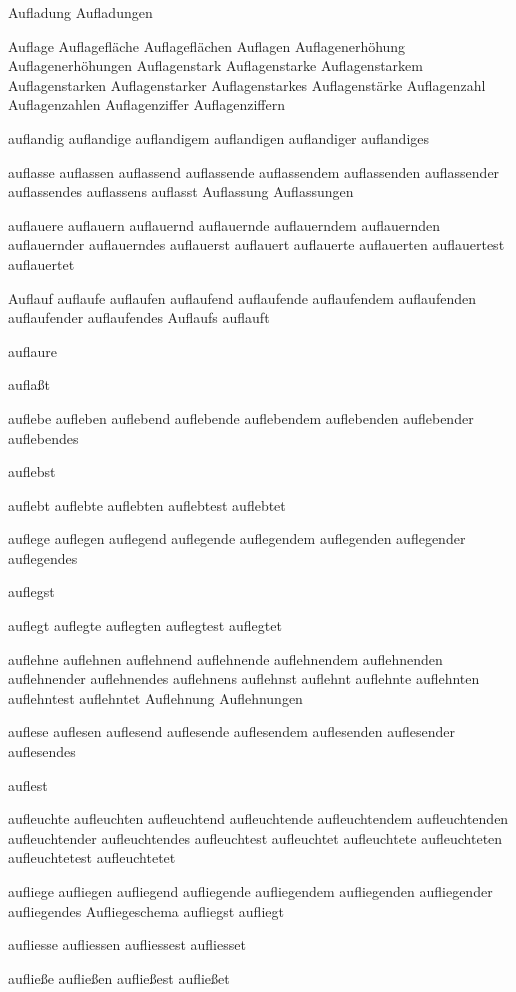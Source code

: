 Aufladung Aufladungen

Auflage Auflagefläche Auflageflächen Auflagen Auflagenerhöhung Auflagenerhöhungen Auflagenstark Auflagenstarke Auflagenstarkem Auflagenstarken Auflagenstarker Auflagenstarkes Auflagenstärke Auflagenzahl Auflagenzahlen Auflagenziffer Auflagenziffern

auflandig auflandige auflandigem auflandigen auflandiger auflandiges

auflasse auflassen auflassend auflassende auflassendem auflassenden auflassender auflassendes auflassens auflasst Auflassung Auflassungen

auflauere auflauern auflauernd auflauernde auflauerndem auflauernden auflauernder auflauerndes auflauerst auflauert auflauerte auflauerten auflauertest auflauertet

Auflauf auflaufe auflaufen auflaufend auflaufende auflaufendem auflaufenden auflaufender auflaufendes Auflaufs auflauft

auflaure

auflaßt

auflebe aufleben auflebend auflebende auflebendem auflebenden auflebender auflebendes

auflebst

auflebt auflebte auflebten auflebtest auflebtet

auflege auflegen auflegend auflegende auflegendem auflegenden auflegender auflegendes

auflegst

auflegt auflegte auflegten auflegtest auflegtet

auflehne auflehnen auflehnend auflehnende auflehnendem auflehnenden auflehnender auflehnendes auflehnens auflehnst auflehnt auflehnte auflehnten auflehntest auflehntet Auflehnung Auflehnungen

auflese auflesen auflesend auflesende auflesendem auflesenden auflesender auflesendes

auflest

aufleuchte aufleuchten aufleuchtend aufleuchtende aufleuchtendem aufleuchtenden aufleuchtender aufleuchtendes aufleuchtest aufleuchtet aufleuchtete aufleuchteten aufleuchtetest aufleuchtetet

aufliege aufliegen aufliegend aufliegende aufliegendem aufliegenden aufliegender aufliegendes Aufliegeschema aufliegst aufliegt

aufliesse aufliessen aufliessest aufliesset

aufließe aufließen aufließest aufließet

